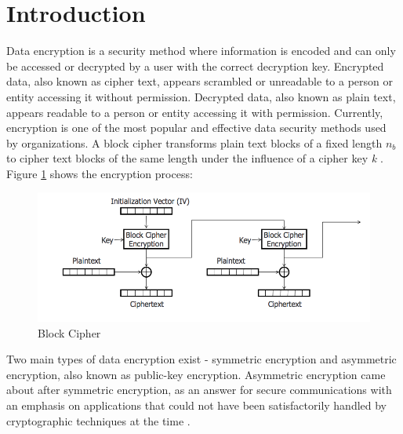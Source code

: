 \documentclass[journal]{IEEEtran}
\begin{document}
\section{\textbf{Introduction}}
Data encryption is a security method where information is encoded and can only be accessed or decrypted by a user with the correct decryption key. Encrypted data, also known as cipher text, appears scrambled or unreadable to a person or entity accessing it without permission. Decrypted data, also known as plain text, appears readable to a person or entity accessing it with permission. Currently, encryption is one of the most popular and effective data security methods used by organizations. A block cipher transforms plain text blocks of a fixed length \textit{${n_b}$} to cipher text blocks of the same length under the influence of a cipher key \textit{k} \cite{block_cipher}. Figure \ref{fig:block_cipher} shows the encryption process:

\newline
\begin{figure}[!hb]
    \centering
    \includegraphics[scale=.3]{block_cipher}
    \caption{Block Cipher}
    \label{fig:block_cipher}
\end{figure}

Two main types of data encryption exist - symmetric encryption and asymmetric encryption, also known as public-key encryption. Asymmetric encryption came about after symmetric encryption, as an answer for secure communications with an emphasis on applications that could not have been satisfactorily handled by cryptographic techniques at the time \cite{asymm_symm}.
\end{document}
